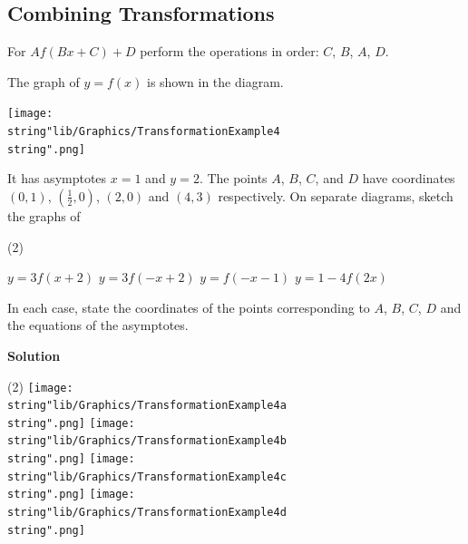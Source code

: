 \documentclass[11pt,a4paper]{book}
\begin{document}
\newpage


\subsection{Combining Transformations}

For $Af(Bx+C)+D$ perform the operations in order: $C$, $B$, $A$, $D$. 

\begin{example}{}

The graph of $y=f\left(x\right)$ is shown in the diagram.
\begin{center}
\texttt{[image: \\string"lib/Graphics/TransformationExample4\\string".png]}
\par\end{center}

It has asymptotes $x=1$ and $y=2$. The points $A$, $B$, $C$,
and $D$ have coordinates $\left(0,1\right)$, ${\displaystyle \left(\frac{1}{2},0\right)}$,
$\left(2,0\right)$ and $\left(4,3\right)$ respectively. On separate diagrams, sketch the graphs of

\begin{tasks}[label=(\alph*),label-width=3.5ex] (2)

\task $y=3f\left(x+2\right)$
\task $y=3f\left(-x+2\right)$
\task $y=f\left(-x-1\right)$
\task  $y=1-4f\left(2x\right)$

\end{tasks}


In each case, state the coordinates of the points corresponding to
$A$, $B$, $C$, $D$ and the equations of the asymptotes.

\textbf{Solution}

\begin{tasks}[label=(\alph*),label-width=3.5ex] (2)
\task \texttt{[image: \\string"lib/Graphics/TransformationExample4a\\string".png]}
\task \texttt{[image: \\string"lib/Graphics/TransformationExample4b\\string".png]}
\task \texttt{[image: \\string"lib/Graphics/TransformationExample4c\\string".png]}
\task \texttt{[image: \\string"lib/Graphics/TransformationExample4d\\string".png]}
\end{tasks}

\end{example}
\end{document}
